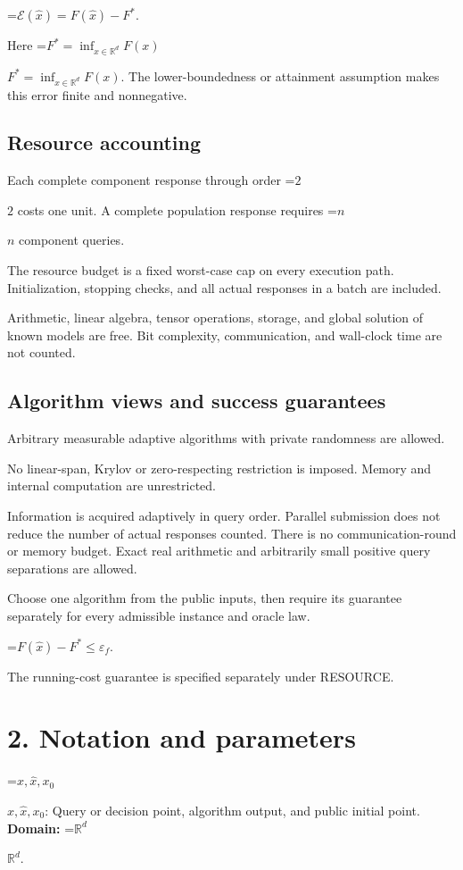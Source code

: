 \documentclass[10pt,a4paper]{article}
\newcommand{\AtlasMath}[1]{\par\begingroup\centering\setbox0=\hbox{$\displaystyle #1$}\ifdim\wd0>1.4\linewidth\typeout{ATLAS WIDE FORMULA: \the\wd0}\fi\ifdim\wd0>\linewidth\resizebox{\linewidth}{!}{\box0}\else\box0\fi\par\endgroup}
\newcommand{\AtlasInlineMath}[1]{\begingroup\setbox0=\hbox{$#1$}\ifdim\wd0>.4\linewidth\endgroup\AtlasMath{#1}\else\endgroup$#1$\fi}
\begin{document}
\AtlasMath{\mathcal{E}(\widehat{x})=F(\widehat{x})-F^*.}


Here \AtlasInlineMath{F^*=\inf_{x\in \mathbb{R}^d}F(x)}. The lower-boundedness or attainment assumption makes this error finite and nonnegative.

\subsection{Resource accounting}
Each complete component response through order \AtlasInlineMath{2} costs one unit. A complete population response requires \AtlasInlineMath{n} component queries.

The resource budget is a fixed worst-case cap on every execution path. Initialization, stopping checks, and all actual responses in a batch are included.

Arithmetic, linear algebra, tensor operations, storage, and global solution of known models are free. Bit complexity, communication, and wall-clock time are not counted.

\subsection{Algorithm views and success guarantees}
Arbitrary measurable adaptive algorithms with private randomness are allowed.

No linear-span, Krylov or zero-respecting restriction is imposed. Memory and internal computation are unrestricted.

Information is acquired adaptively in query order. Parallel submission does not reduce the number of actual responses counted. There is no communication-round or memory budget. Exact real arithmetic and arbitrarily small positive query separations are allowed.

Choose one algorithm from the public inputs, then require its guarantee separately for every admissible instance and oracle law.


\AtlasMath{F(\widehat{x})-F^*\le \varepsilon_f.}


The running-cost guarantee is specified separately under RESOURCE.

\section{2. Notation and parameters}
\AtlasInlineMath{x,\widehat{x},x_0}: Query or decision point, algorithm output, and public initial point. \textbf{Domain:} \AtlasInlineMath{\mathbb{R}^d}.
\end{document}

